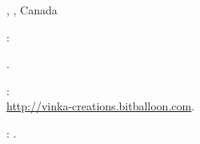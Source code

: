 \textbf{\large \current}

{\jobt{\consultant}, \nameMontreal, Canada
\begin{list}{} {\leftmargin=-1cm \itemsep-3pt} 
\vspace*{-0.2cm}
\item \webdev:
\vspace*{-0.3cm}
   \begin{list}{} {\leftmargin=0.5cm \itemsep-1pt} 
   \item \webdevA.
   \item \webdevB:\\
   \href{http://vinka-creations.bitballoon.com}%
     {\footnotesize{\url{http://vinka-creations.bitballoon.com}}}.
   \end{list}

\vspace*{-0.2cm}
\item \nameWriter: \writerDesc.
\end{list}
}
